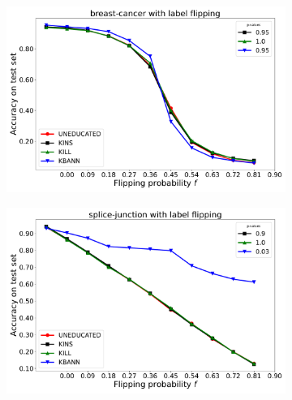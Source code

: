 \begin{figure}
\begin{subfigure}{\cellsize}
	\end{subfigure}

	\begin{subfigure}{\cellsize}
		\caption{}
		\label{fig:bcw-label}
		\includegraphics[width=\linewidth]{figures/label_flip/breast-cancer/uneducated-kins-kill-kbann-accuracy-average-curves}
	\end{subfigure}\hfil
	\begin{subfigure}{\cellsize}
		\caption{}
		\label{fig:psjgs-label}
		\includegraphics[width=\linewidth]{figures/label_flip/splice-junction/uneducated-kins-kill-kbann-accuracy-average-curves}
	\end{subfigure}\hfil
	\begin{subfigure}{\cellsize}
		\caption{}
		\label{fig:ci-label}

\end{subfigure}
\end{figure}
